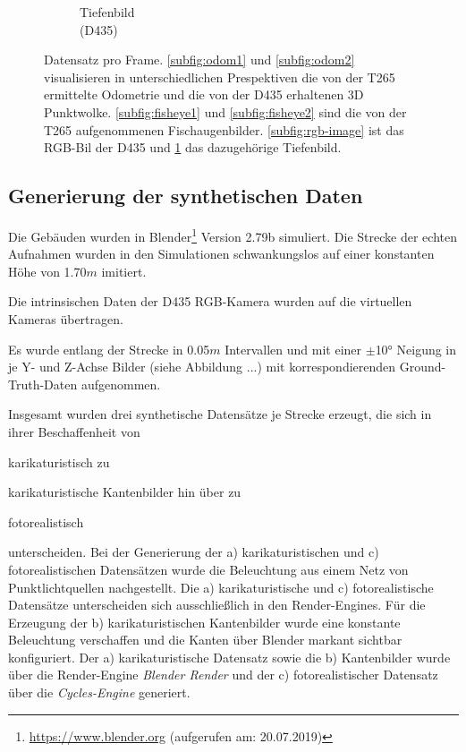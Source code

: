 \begin{figure}[H]
\begin{subfigure}[b]{0.3\linewidth}
		\caption{Tiefenbild \\ (D435) \hspace*{2cm}}
		\label{subfig:depth-image}
	\end{subfigure}
	\caption{Datensatz pro Frame. \ref{subfig:odom1}  und \ref{subfig:odom2} visualisieren in unterschiedlichen Prespektiven die von der T265 ermittelte Odometrie und die von der D435 erhaltenen 3D Punktwolke. \ref{subfig:fisheye1} und \ref{subfig:fisheye2} sind die von der T265 aufgenommenen Fischaugenbilder. \ref{subfig:rgb-image} ist das RGB-Bil der D435 und \ref{subfig:depth-image} das dazugehörige Tiefenbild. }
	\label{fig:dataset}
\end{figure}


\subsection{Generierung der synthetischen Daten}
\label{subsec:generate_synth_images}

Die Gebäuden wurden in Blender\footnote{\url{https://www.blender.org} (aufgerufen am: 20.07.2019)} Version 2.79b simuliert. Die Strecke der echten Aufnahmen wurden in den Simulationen schwankungslos auf einer konstanten Höhe von 1.70$m$ imitiert.


Die intrinsischen Daten der D435 RGB-Kamera wurden auf die virtuellen Kameras übertragen. 

Es wurde entlang der Strecke in 0.05$m$ Intervallen und mit einer $\pm$10° Neigung in je Y- und Z-Achse Bilder (siehe Abbildung ...) mit korrespondierenden Ground-Truth-Daten aufgenommen.

Insgesamt wurden drei synthetische Datensätze je Strecke erzeugt, die sich in ihrer Beschaffenheit von \begin{enumerate*}[label=\alph*)]
	\item karikaturistisch zu
	\item karikaturistische Kantenbilder hin über zu
	\item fotorealistisch
\end{enumerate*} unterscheiden. Bei der Generierung der a) karikaturistischen und c) fotorealistischen Datensätzen wurde die Beleuchtung aus einem Netz von Punktlichtquellen nachgestellt. Die a) karikaturistische und c) fotorealistische Datensätze unterscheiden sich ausschließlich in den Render-Engines.
Für die Erzeugung der b) karikaturistischen Kantenbilder wurde eine konstante Beleuchtung verschaffen und die Kanten über Blender markant sichtbar konfiguriert. Der a) karikaturistische Datensatz sowie die b) Kantenbilder wurde über die Render-Engine \textit{Blender Render} und der c) fotorealistischer Datensatz über die \textit{Cycles-Engine} generiert.


